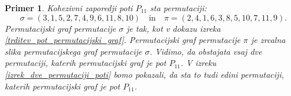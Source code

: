 \documentclass[a4paper, 12pt]{book}
\newtheorem{primer}{Primer}[chapter]
\begin{document}
\begin{primer}
Kohezivni zaporedji poti $P_{11}$ sta permutaciji:
\[
    \sigma = (3, 1, 5, 2, 7, 4, 9, 6, 11, 8, 10) \quad \text{in} \quad \pi = (2, 4, 1, 6, 3, 8, 5, 10, 7, 11, 9). 
\]
Permutacijski graf permutacije $\sigma$ je tak, kot v dokazu izreka \ref{trditev_pot_permutacijski_graf}. Permutacijski graf permutacije $\pi$ je zrcalna slika permutacijskega graf permutacije $\sigma$.
Vidimo, da obstajata vsaj dve permutaciji, katerih permutacijski graf je pot $P_{11}$. V izreku \ref{izrek_dve_permutaciji_poti} bomo pokazali, da sta to tudi edini permutaciji, katerih permutacijski graf je pot $P_{11}$.
\end{primer}





\end{document}
